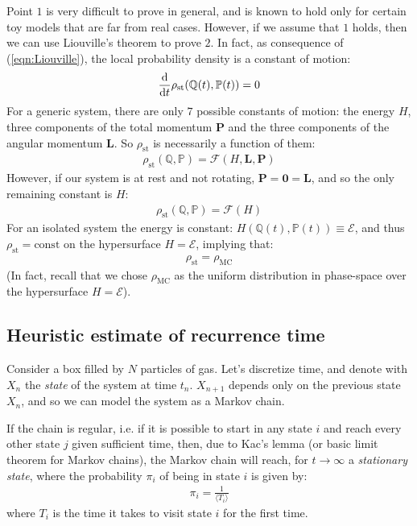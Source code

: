 \documentclass[../template.tex]{subfiles}
\begin{document}
Point $1$ is very difficult to prove in general, and is known to hold only for certain toy models that are far from real cases. However, if we assume that $1$ holds, then we can use Liouville's theorem to prove $2$. In fact, as consequence of (\ref{eqn:Liouville}), the local probability density is a constant of motion:
\begin{align*}
    \dv{t} \rho_{\mathrm{st}}(\mathbb{Q}(t), \mathbb{P}(t)) = 0
\end{align*}
For a generic system, there are only $7$ possible constants of motion: the energy $H$, three components of the total momentum $\bm{P}$ and the three components of the angular momentum $\bm{L}$. So $\rho_{\mathrm{st}}$ is necessarily a function of them:
\begin{align*}
    \rho_{\mathrm{st}}(\mathbb{Q}, \mathbb{P}) = \mathcal{F}(H, \bm{L}, \bm{P})
\end{align*}
However, if our system is at rest and not rotating, $\bm{P} = \bm{0} = \bm{L}$, and so the only remaining constant is $H$:
\begin{align*}
    \rho_{\mathrm{st}}(\mathbb{Q}, \mathbb{P}) = \mathcal{F}(H)
\end{align*}
For an isolated system the energy is constant: $H(\mathbb{Q}(t), \mathbb{P}(t)) \equiv \mathcal{E}$, and thus $\rho_{\mathrm{st}} = \text{const}$ on the hypersurface $H=\mathcal{E}$, implying that:
\begin{align*}
    \rho_{\mathrm{st}} = \rho_{\mathrm{MC}}
\end{align*}
(In fact, recall that we chose $\rho_{\mathrm{MC}}$ as the uniform distribution in phase-space over the hypersurface $H=\mathcal{E}$).

\subsection{Heuristic estimate of recurrence time}
Consider a box filled by $N$ particles of gas. Let's discretize time, and denote with $X_n$ the \textit{state} of the system at time $t_n$. $X_{n+1}$ depends only on the previous state $X_n$, and so we can model the system as a Markov chain. %

If the chain is regular, i.e. if it is possible to start in any state $i$ and reach every other state $j$ given sufficient time, then, due to Kac's lemma (or basic limit theorem for Markov chains), the Markov chain will reach, for $t \to \infty$ a \textit{stationary state}, where the probability $\pi_i$ of being in state $i$ is given by:
\begin{align*}
    \pi_i = \frac{1}{\langle T_i \rangle} 
\end{align*}
where $T_i$ is the time it takes to visit state $i$ for the first time. 
\end{document}
